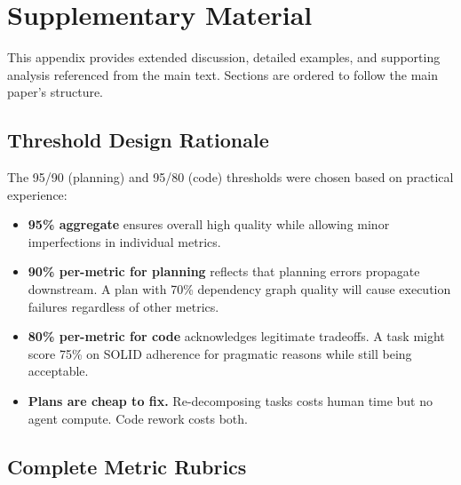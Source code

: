 \section{Supplementary Material}
\label{sec:supplementary}

This appendix provides extended discussion, detailed examples, and supporting analysis
referenced from the main text. Sections are ordered to follow the main paper's
structure.


\subsection{Threshold Design Rationale}
\label{subsec:threshold-rationale}

The 95/90 (planning) and 95/80 (code) thresholds were chosen based on
practical experience:

\begin{itemize}
    \item \textbf{95\% aggregate} ensures overall high quality while allowing
    minor imperfections in individual metrics.

    \item \textbf{90\% per-metric for planning} reflects that planning errors
    propagate downstream. A plan with 70\% dependency graph quality will
    cause execution failures regardless of other metrics.

    \item \textbf{80\% per-metric for code} acknowledges legitimate tradeoffs.
    A task might score 75\% on SOLID adherence for pragmatic reasons while
    still being acceptable.

    \item \textbf{Plans are cheap to fix.} Re-decomposing tasks costs human
    time but no agent compute. Code rework costs both.
\end{itemize}

\subsection{Complete Metric Rubrics}
\label{sec:appendix-metrics}

